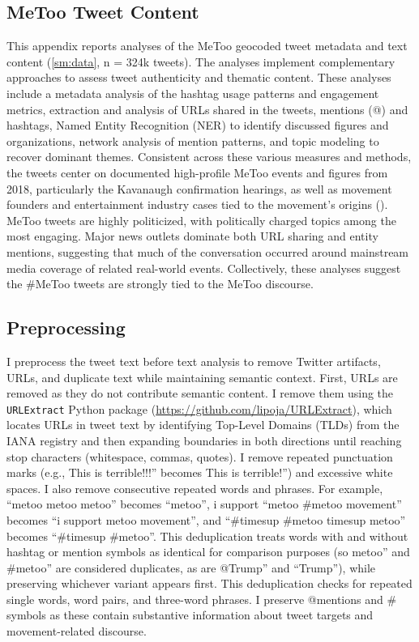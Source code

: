 \documentclass[manuscript,screen,nonacm,11pt,acm]{acmart}
\begin{document}
\begin{bibunit}
\section{MeToo Tweet Content}
\label{sm:text}
This appendix reports analyses of the MeToo geocoded tweet metadata and text content (\cref{sm:data}, n = 324k tweets).
The analyses implement complementary approaches to assess tweet authenticity and thematic content.
These analyses include a metadata analysis of the hashtag usage patterns and engagement metrics, extraction and analysis of URLs shared in the tweets, mentions (@) and hashtags, Named Entity Recognition (NER) to identify discussed figures and organizations, network analysis of mention patterns, and topic modeling to recover dominant themes.
Consistent across these various measures and methods, the tweets center on documented high-profile MeToo events and figures from 2018, particularly the Kavanaugh confirmation hearings, as well as movement founders and entertainment industry cases tied to the movement's origins ().
MeToo tweets are highly politicized, with politically charged topics among the most engaging.
Major news outlets dominate both URL sharing and entity mentions, suggesting that much of the conversation occurred around mainstream media coverage of related real-world events.
Collectively, these analyses suggest the \#MeToo tweets are strongly tied to the MeToo discourse.

\subsection{Preprocessing}
I preprocess the tweet text before text analysis to remove Twitter artifacts, URLs, and duplicate text while maintaining semantic context.
First, URLs are removed as they do not contribute semantic content.
I remove them using the \texttt{URLExtract} Python package (\url{https://github.com/lipoja/URLExtract}), which locates URLs in tweet text by identifying Top-Level Domains (TLDs) from the IANA registry and then expanding boundaries in both directions until reaching stop characters (whitespace, commas, quotes).
I remove repeated punctuation marks (e.g., This is terrible!!!'' becomes This is terrible!'') and excessive white spaces.
I also remove consecutive repeated words and phrases.
For example, ``metoo metoo metoo'' becomes ``metoo'', i support ``metoo \#metoo movement'' becomes ``i support metoo movement'', and ``\#timesup \#metoo timesup metoo'' becomes ``\#timesup \#metoo''.
This deduplication treats words with and without hashtag or mention symbols as identical for comparison purposes (so metoo'' and \#metoo'' are considered duplicates, as are @Trump'' and ``Trump''), while preserving whichever variant appears first.
This deduplication checks for repeated single words, word pairs, and three-word phrases.
I preserve @mentions and \# symbols as these contain substantive information about tweet targets and movement-related discourse.


\end{bibunit}
\end{document}
